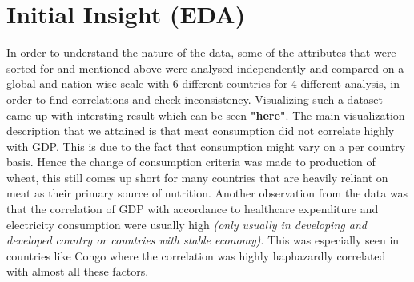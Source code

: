 \documentclass[conference]{IEEEtran}
\begin{document}
\section{Initial Insight (EDA)}
In order to understand the nature of the data, some of the attributes that were sorted for and mentioned above were analysed independently and compared on a global and nation-wise scale with 6 different countries for 4 different analysis, in order to find correlations and check inconsistency.
Visualizing such a dataset came up with intersting result which can be seen \textbf{\href{https://github.com/NeerajG03/Economic_Growth-Versus-Factors}{"here"}}.
The main visualization description that we attained is that meat consumption did not correlate highly with GDP.
This is due to the fact that consumption might vary on a per country basis.
Hence the change of consumption criteria was made to production of wheat, this still comes up short for many countries that are heavily reliant on meat as their primary source of nutrition.
Another observation from the data was that the correlation of GDP with accordance to healthcare expenditure and electricity consumption were usually high
\emph{(only usually in developing and developed country or countries with stable economy)}. This was especially seen in countries like Congo where the correlation was highly haphazardly correlated with almost all these factors.
\end{document}
